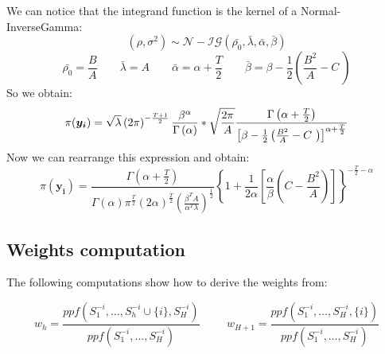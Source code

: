 \documentclass[12pt,a4paper]{article}
\begin{document}
We can notice that the integrand function is the kernel of a Normal-InverseGamma:
$$
\left(\rho,\sigma^{2}\right) \sim \mathcal{N-IG}\left( \bar{\rho_{0}},\bar{\lambda},\bar{\alpha},\bar{\beta}  \right)
$$
$$
\bar{\rho_{0}}  = \frac{B}{A} \qquad
\bar{\lambda}  = A  \qquad
\bar{\alpha}  =  \alpha + \frac{T}{2} \qquad
\bar{\beta}  = \beta - \frac{1}{2}\left(\frac{B^{2}}{A}-C\ \right)
$$
So we obtain:
$$
\pi(\boldsymbol{y_i}) = \sqrt{\lambda} \left(2\pi\right)^{-\frac{T+1}{2}}\frac{\beta^{\alpha}}{\Gamma\left(\alpha\right)} * \sqrt{\frac{2\pi}{A}} \frac{\Gamma\left(\alpha+\frac{T}{2}\right)}{\left[\beta - \frac{1}{2}\left(\frac{B^{2}}{A}-C\ \right)\right]^{\alpha+\frac{T}{2}}}
\\
$$
Now we can rearrange this expression and obtain:
$$
\pi(\boldsymbol{y_i}) = \frac{\Gamma(\alpha + \frac{T}{2})}{\Gamma(\alpha)\pi^{\frac{T}{2}}(2 \alpha)^{\frac{T}{2}} \left(\frac{\beta^T A}{\alpha^T \lambda}\right)^{\frac{1}{2}}}\left\{1+\frac{1}{2 \alpha}\left[\frac{\alpha}{\beta}\left(C-\frac{B^2}{A}\right)\right]\right\}^{-\frac{T}{2}-\alpha} 
$$




\subsection{Weights computation}\label{weights}

 The following computations show how to derive the weights from:

$$
w_{h}=\frac{p p f\left(S_{1}^{-i}, \ldots, S_{h}^{-i} \cup\{i\}, S_{H}^{-i}\right)}{p p f\left(S_{1}^{-i}, \ldots, S_{H}^{-i}\right)} 
\hspace{1cm}
w_{H+1}=\frac{p p f\left(S_{1}^{-i}, \ldots, S_{H}^{-i},\{i\}\right)}{p p f\left(S_{1}^{-i}, \ldots, S_{H}^{-i}\right)}
$$

\\
\end{document}
